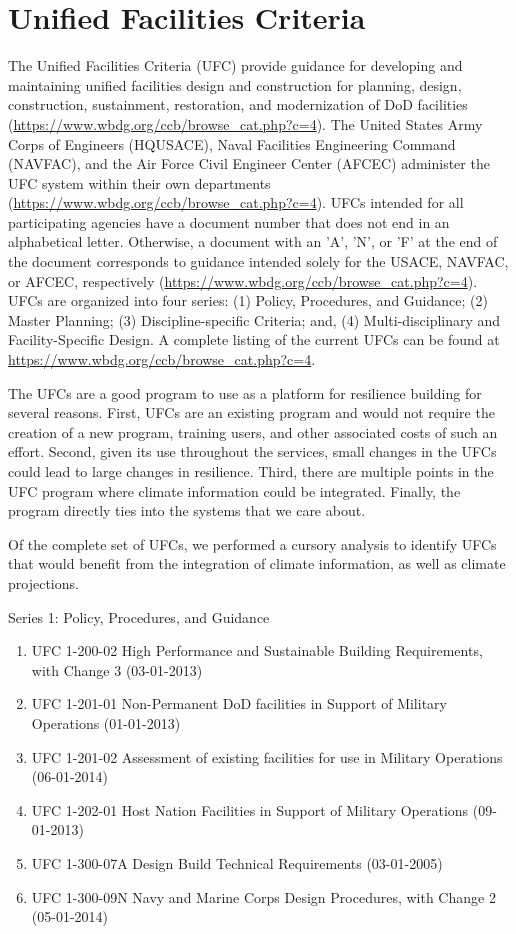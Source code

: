 \documentclass[10pt]{amsart}
\begin{document}
\section{Unified Facilities Criteria}
The Unified Facilities Criteria (UFC) provide guidance for developing and maintaining unified facilities design and construction for planning, design, construction, sustainment, restoration, and modernization of DoD facilities \parencite{}(\url{https://www.wbdg.org/ccb/browse_cat.php?c=4}).
The United States Army Corps of Engineers (HQUSACE), Naval Facilities Engineering Command (NAVFAC), and the Air Force Civil Engineer Center (AFCEC) administer the UFC system within their own departments \parencite{} (\url{https://www.wbdg.org/ccb/browse_cat.php?c=4}).
UFCs intended for all participating agencies have a document number that does not end in an alphabetical letter. 
Otherwise, a document with an 'A', 'N', or 'F' at the end of the document corresponds to guidance intended solely for the USACE, NAVFAC, or AFCEC, respectively \parencite{}(\url{https://www.wbdg.org/ccb/browse_cat.php?c=4}).
UFCs are organized into four series: (1) Policy, Procedures, and Guidance; (2) Master Planning; (3) Discipline-specific Criteria; and, (4) Multi-disciplinary and Facility-Specific Design. 
A complete listing of the current UFCs can be found at \url{https://www.wbdg.org/ccb/browse_cat.php?c=4}.

The UFCs are a good program to use as a platform for resilience building for several reasons.
First, UFCs are an existing program and would not require the creation of a new program, training users, and other associated costs of such an effort.
Second, given its use throughout the services, small changes in the UFCs could lead to large changes in resilience.
Third, there are multiple points in the UFC program where climate information could be integrated.
Finally, the program directly ties into the systems that we care about. 

Of the complete set of UFCs, we performed a cursory analysis to identify UFCs that would benefit from the integration of climate information, as well as climate projections.

Series 1: Policy, Procedures, and Guidance
\begin{enumerate}
\item UFC 1-200-02 High Performance and Sustainable Building Requirements, with Change 3 (03-01-2013)
\item UFC 1-201-01 Non-Permanent DoD facilities in Support of Military Operations (01-01-2013)
\item UFC 1-201-02 Assessment of existing facilities for use in Military Operations (06-01-2014)
\item UFC 1-202-01 Host Nation Facilities in Support of Military Operations (09-01-2013)
\item UFC 1-300-07A Design Build Technical Requirements (03-01-2005)
\item UFC 1-300-09N Navy and Marine Corps Design Procedures, with Change 2 (05-01-2014)
\end{enumerate}
\end{document}
